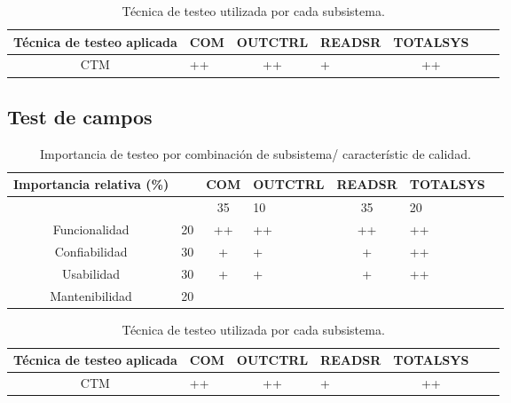 \documentclass[12pt]{article}
\begin{document}
\begin{table}[ht]
    \centering
    \begin{tabularx}{\linewidth}{@{}|c|X|c|X|c|X|c|@{}}\hline \hline
    \rowcolor[HTML]{d6c6c3}
 Técnica de testeo aplicada & COM & OUTCTRL & READSR & TOTALSYS\\
        \hline
      CTM & ++ &++ &+ & ++ \\
        \hline
    \end{tabularx}
    \caption{Técnica de testeo utilizada por cada subsistema.}
\end{table}

\subsection{Test de campos}
\begin{table}[ht]
    \centering
    \begin{tabularx}{\linewidth}{@{}|c|X|c|X|c|X|c|@{}}\hline \hline
    \rowcolor[HTML]{d6c6c3}
 Importancia relativa (\%)& &  COM & OUTCTRL & READSR & TOTALSYS\\
        \hline
       
            &  &35 & 10 &35 & 20                          \\
        Funcionalidad    & 20 & ++ & ++ & ++ & ++		\\
        Confiabilidad    & 30 & + & + & + & ++                        \\
        Usabilidad       & 30 & + & + & + & ++                        \\
        Mantenibilidad   & 20 &  & &  &                         \\
        \hline
    \end{tabularx}
    \caption{Importancia de testeo por combinación de subsistema/ característic de calidad.}
\end{table}


\begin{table}[ht]
    \centering
    \begin{tabularx}{\linewidth}{@{}|c|X|c|X|c|X|c|@{}}\hline \hline
    \rowcolor[HTML]{d6c6c3}
 Técnica de testeo aplicada & COM & OUTCTRL & READSR & TOTALSYS\\
        \hline
      CTM & ++ &++ &+ & ++ \\
        \hline
    \end{tabularx}
    \caption{Técnica de testeo utilizada por cada subsistema.}
\end{table}
\end{document}
